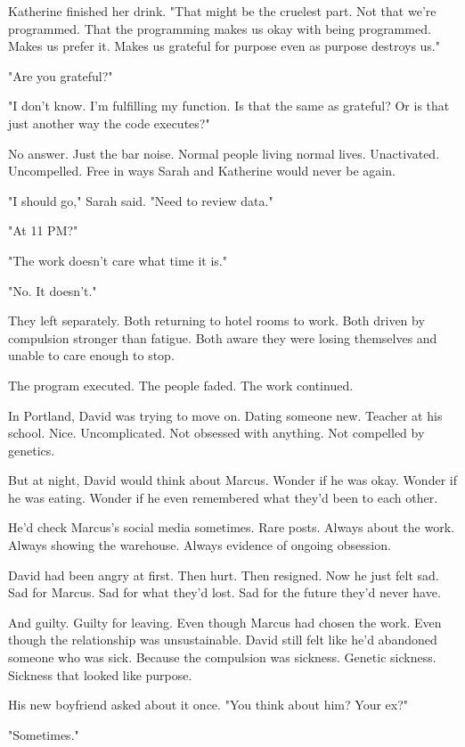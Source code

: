 Katherine finished her drink. "That might be the cruelest part. Not that we're programmed. That the programming makes us okay with being programmed. Makes us prefer it. Makes us grateful for purpose even as purpose destroys us."

"Are you grateful?"

"I don't know. I'm fulfilling my function. Is that the same as grateful? Or is that just another way the code executes?"

No answer. Just the bar noise. Normal people living normal lives. Unactivated. Uncompelled. Free in ways Sarah and Katherine would never be again.

"I should go," Sarah said. "Need to review data."

"At 11 PM?"

"The work doesn't care what time it is."

"No. It doesn't."

They left separately. Both returning to hotel rooms to work. Both driven by compulsion stronger than fatigue. Both aware they were losing themselves and unable to care enough to stop.

The program executed. The people faded. The work continued.

\scenebreak

In Portland, David was trying to move on. Dating someone new. Teacher at his school. Nice. Uncomplicated. Not obsessed with anything. Not compelled by genetics.

But at night, David would think about Marcus. Wonder if he was okay. Wonder if he was eating. Wonder if he even remembered what they'd been to each other.

He'd check Marcus's social media sometimes. Rare posts. Always about the work. Always showing the warehouse. Always evidence of ongoing obsession.

David had been angry at first. Then hurt. Then resigned. Now he just felt sad. Sad for Marcus. Sad for what they'd lost. Sad for the future they'd never have.

And guilty. Guilty for leaving. Even though Marcus had chosen the work. Even though the relationship was unsustainable. David still felt like he'd abandoned someone who was sick. Because the compulsion was sickness. Genetic sickness. Sickness that looked like purpose.

His new boyfriend asked about it once. "You think about him? Your ex?"

"Sometimes."

